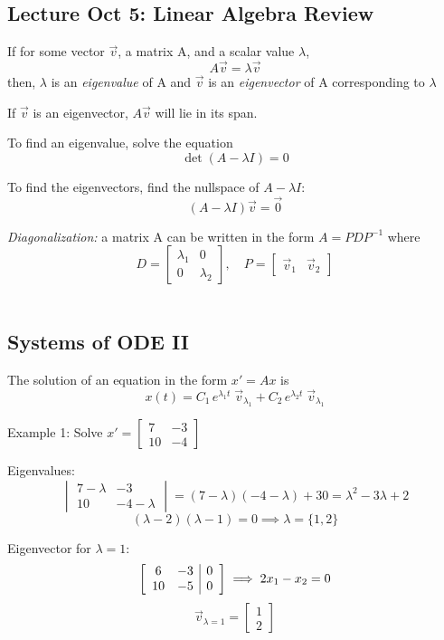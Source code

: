 \documentclass[12pt]{article}
\begin{document}
\subsection*{Lecture Oct 5: Linear Algebra Review}
If for some vector $\vec{v}$, a matrix A, and a scalar value $\lambda$, 
\[A\vec{v} = \lambda\vec{v}\]
then,
$\lambda$ is an \emph{eigenvalue} of A and $\vec{v}$ is an \emph{eigenvector} of A corresponding to $\lambda$

If $\vec{v}$ is an eigenvector, $A\vec{v}$ will lie in its span. 

To find an eigenvalue, solve the equation
\[\det (A - \lambda I) = 0\]

To find the eigenvectors, find the nullspace of $A - \lambda I$: 
\[(A - \lambda I)\vec{v} = \vec{0}\]

\emph{Diagonalization:} a matrix A can be written in the form $A = PDP^{-1}$ where
\[D = \begin{bmatrix}
    \lambda_1 & 0\\
    0 & \lambda_2
\end{bmatrix}, \quad P = \begin{bmatrix}
    \vec{v}_1 & \vec{v}_2
\end{bmatrix}\]\

\subsection*{Systems of ODE II}
The solution of an equation in the form $x' = Ax$ is 
\[x(t) = C_1 \, e^{\lambda_1 t}\; \vec{v}_{\lambda_1} + C_2 \, e^{\lambda_2 t}\; \vec{v}_{\lambda_1}\]

Example 1: Solve $x' = \begin{bmatrix}
    7 & -3\\
    10 & -4
\end{bmatrix}$

Eigenvalues:
\[\begin{vmatrix}
    7 - \lambda & -3\\
    10 & -4 - \lambda
\end{vmatrix} = (7- \lambda)(-4-\lambda) +30 = \lambda^2 - 3\lambda + 2\]
\[(\lambda - 2)(\lambda - 1) = 0 \implies \lambda = \{1, 2\}\]

Eigenvector for $\lambda = 1$:
\[\left[\begin{array}{c c | c}
    6 & -3 & 0\\
    10 & -5 & 0
\end{array} \right]\implies 2x_1 - x_2 = 0\]
\[\vec{v}_{\lambda = 1} = \begin{bmatrix}
    1\\
    2
\end{bmatrix}\]
\end{document}
